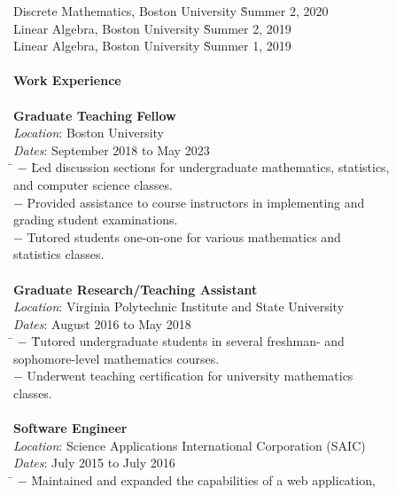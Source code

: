 \begin{center}
\begin{tabbing}
	\> Discrete Mathematics, Boston University  \` Summer 2, 2020 \\
	\> Linear Algebra, Boston University  \`Summer 2, 2019 \\
	\> Linear Algebra, Boston University   \`Summer 1, 2019 \\
	\\
	\textbf{{Work Experience}}  \\ 
	\> \\
	\> \textbf{Graduate Teaching Fellow} \\
	\> \> \emph{Location}: Boston University \\
	\> \> \emph{Dates}: September 2018 to May 2023 \\
	\> \>  \hspace{1em} \= $-$ \= Led discussion sections for undergraduate mathematics, statistics, \\
	\> \> \> \>  and computer science classes. \\ 
	\> \> \> $-$ Provided assistance to course instructors in implementing and \\
	\> \> \> \>grading student examinations. \\
	\> \> \> $-$ Tutored students one-on-one for various mathematics and \\
	\> \> \> \> statistics classes. \\
	\> \\
	\> \textbf{Graduate Research/Teaching Assistant} \\
	\> \> \emph{Location}: Virginia Polytechnic Institute and State University \\
	\> \> \emph{Dates}: August 2016 to May 2018 \\
	\> \>  \hspace{1em} \= $-$ \=Tutored undergraduate students in several freshman- and \\
	\> \> \> \> sophomore-level mathematics courses. \\
	\> \> \> $-$ Underwent teaching certification for university mathematics \\
	\> \> \> \> classes. \\
	\> \\ 
	\> \textbf{Software Engineer} \\
	\> \> \emph{Location}: Science Applications International Corporation (SAIC) \\
	\> \> \emph{Dates}: July 2015 to July 2016 \\
	\> \> \hspace{1em} \= $-$ \=Maintained and expanded the capabilities of a web application, \\

\end{tabbing}
\end{center}
